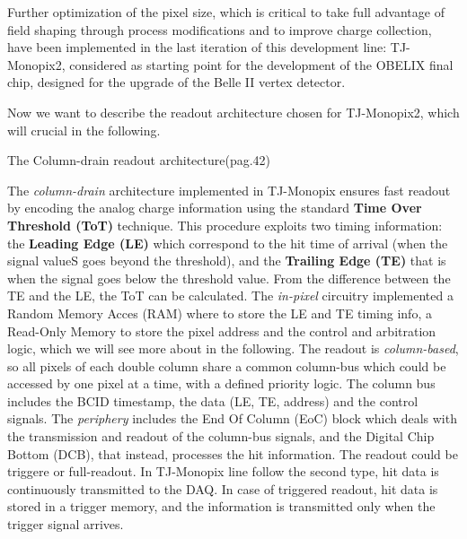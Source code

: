 
Further optimization of the pixel size, which is critical to take full advantage of field shaping through process modifications and to improve charge collection, have been implemented in the last iteration of this development line: TJ-Monopix2, considered as starting point for the development of the OBELIX final chip, designed for the upgrade of the Belle II vertex detector.  


Now we want to describe the readout architecture chosen for TJ-Monopix2, which will crucial in the following. 

\begin{description}
\item[The Column-drain readout architecture(pag.42)]
\end{description}

The \textit{column-drain} architecture implemented in TJ-Monopix ensures fast readout by encoding the analog charge information using the standard \textbf{Time Over Threshold (ToT)} technique. This procedure exploits two timing information: the \textbf{Leading Edge (LE)} which correspond to the hit time of arrival (when the signal valueS goes beyond the threshold), and the \textbf{Trailing Edge (TE)} that is when the signal goes below the threshold value. From the difference between the TE and the LE, the ToT can be calculated. 
The \textit{in-pixel} circuitry implemented a Random Memory Acces (RAM) where to store the LE and TE timing info, a Read-Only Memory to store the pixel address and the control and arbitration logic, which we will see more about in the following. 
The readout is \textit{column-based}, so all pixels of each double column share a common column-bus which could be accessed by one pixel at a time, with a defined priority logic. The column bus includes the BCID timestamp, the data (LE, TE, address) and the control signals.
The \textit{periphery} includes the End Of Column (EoC) block which deals with the transmission and readout of the column-bus signals, and the Digital Chip Bottom (DCB), that instead, processes the hit information. 
The readout could be triggere or full-readout. In TJ-Monopix line follow the second type, hit data is continuously transmitted to the DAQ. In case of triggered readout, hit data is stored in a trigger memory, and the information is transmitted only when the trigger signal arrives.

